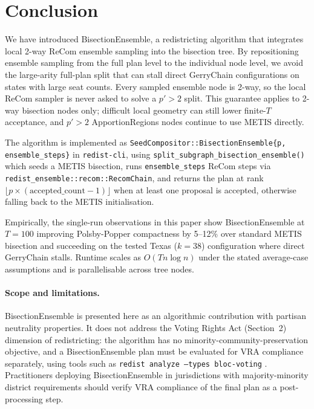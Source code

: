 \section{Conclusion}
\label{sec:conclusion}

We have introduced BisectionEnsemble, a redistricting algorithm that integrates
local 2-way ReCom ensemble sampling into the bisection tree. By repositioning
ensemble sampling from the full plan level to the individual node level, we
avoid the large-arity full-plan split that can stall direct GerryChain
configurations on states with large seat counts. Every sampled ensemble node is
2-way, so the local ReCom sampler is never asked to solve a $p'>2$ split.
This guarantee applies to 2-way bisection nodes only; difficult local geometry
can still lower finite-$T$ acceptance, and $p'>2$ ApportionRegions nodes
continue to use METIS directly.

The algorithm is implemented as \texttt{SeedCompositor::BisectionEnsemble\{p,
ensemble\_steps\}} in \texttt{redist-cli}, using
\texttt{split\_subgraph\_bisection\_ensemble()} which seeds a METIS bisection,
runs \texttt{ensemble\_steps} ReCom steps via
\texttt{redist\_ensemble::recom::RecomChain}, and returns the plan at rank
$\lfloor p \times (\text{accepted\_count}-1) \rfloor$ when at least one
proposal is accepted, otherwise falling back to the METIS initialisation.

Empirically, the single-run observations in this paper show BisectionEnsemble
at $T=100$ improving Polsby-Popper compactness by 5--12\% over standard METIS
bisection and succeeding on the tested Texas ($k=38$) configuration where
direct GerryChain stalls. Runtime scales as $O(Tn\log n)$ under the stated
average-case assumptions and is parallelisable across tree nodes.

\paragraph{Scope and limitations.}
BisectionEnsemble is presented here as an algorithmic contribution with partisan
neutrality properties. It does not address the Voting Rights Act (Section~2)
dimension of redistricting: the algorithm has no minority-community-preservation
objective, and a BisectionEnsemble plan must be evaluated for VRA compliance
separately, using tools such as \texttt{redist analyze --types bloc-voting}
\citep{dellaLibera2026callais}. Practitioners deploying BisectionEnsemble in
jurisdictions with majority-minority district requirements should verify VRA
compliance of the final plan as a post-processing step.

